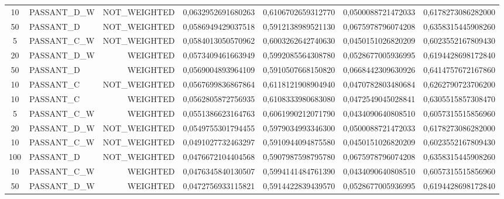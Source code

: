 \begin{table}[H]
{\begin{tabular}{ c l r c c c c }
				10 & PASSANT\_D\_W & NOT\_WEIGHTED & 0,0632952691680263 & 0,6106702659312770 & 0,0500088721472033 & 0,6178273086282000 \\
				
				50 &  PASSANT\_D & NOT\_WEIGHTED & 0,0586949429037518 & 0,5912138989521130 & 0,0675978796074208 & 0,6358315445908260 \\
				
				5 & PASSANT\_C\_W & NOT\_WEIGHTED & 0,0584013050570962 & 0,6003262642740630 & 0,0450151026820209 & 0,6023552167809430 \\
				
				20 & PASSANT\_D\_W &   WEIGHTED & 0,0573409461663949 & 0,5992085564308780 & 0,0528677005936995 & 0,6194428698172840 \\
				
				50 &  PASSANT\_D &   WEIGHTED & 0,0569004893964109 & 0,5910507668150820 & 0,0668442309630926 & 0,6414757672167860 \\
				
				10 &  PASSANT\_C & NOT\_WEIGHTED & 0,0567699836867864 & 0,6118121908904940 & 0,0470782803480684 & 0,6262790723706200 \\
				
				10 &  PASSANT\_C &   WEIGHTED & 0,0562805872756935 & 0,6108333980683080 & 0,0472549045028841 & 0,6305515857308470 \\
				
				5 & PASSANT\_C\_W &   WEIGHTED & 0,0551386623164763 & 0,6061990212071790 & 0,0434090640808510 & 0,6057315515856960 \\
				
				20 & PASSANT\_D\_W & NOT\_WEIGHTED & 0,0549755301794455 & 0,5979034993346300 & 0,0500088721472033 & 0,6178273086282000 \\
				
				10 & PASSANT\_C\_W & NOT\_WEIGHTED & 0,0491027732463297 & 0,5910944094875580 & 0,0450151026820209 & 0,6023552167809430 \\
				
				100 &  PASSANT\_D & NOT\_WEIGHTED & 0,0476672104404568 & 0,5907987598795780 & 0,0675978796074208 & 0,6358315445908260 \\
				
				10 & PASSANT\_C\_W &   WEIGHTED & 0,0476345840130507 & 0,5994141484761390 & 0,0434090640808510 & 0,6057315515856960 \\
				
				50 & PASSANT\_D\_W &   WEIGHTED & 0,0472756933115821 & 0,5914422839439570 & 0,0528677005936995 & 0,6194428698172840 \\
				

\end{tabular}}
\end{table}
